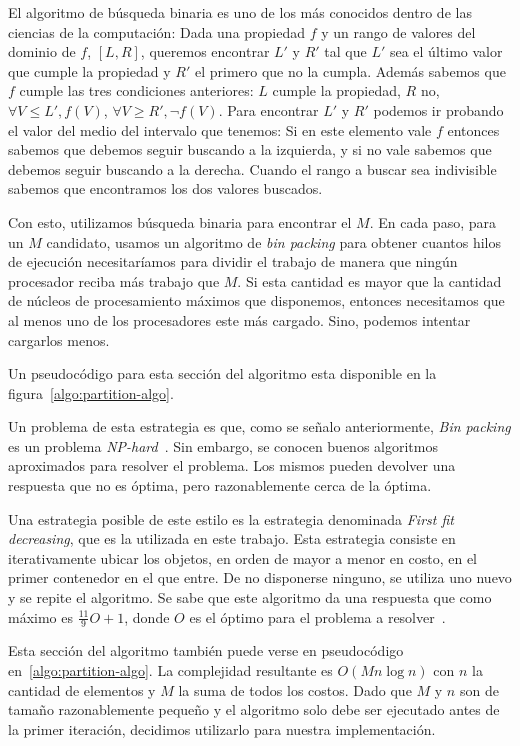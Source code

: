 El algoritmo de b\'usqueda binaria es uno de los m\'as conocidos dentro de las
ciencias de la computaci\'on: Dada una propiedad $f$ y un rango de valores del
dominio de $f$, $[L,R]$, queremos encontrar $L'$ y $R'$ tal que $L'$ sea el
\'ultimo valor que cumple la propiedad y $R'$ el primero que no la cumpla.
Adem\'as sabemos que $f$ cumple las tres condiciones anteriores: $L$ cumple la
propiedad, $R$ no, $\forall V \leq L', f(V)$, $\forall V \geq R', \neg f(V)$.
Para encontrar $L'$ y $R'$ podemos ir probando el valor del medio del intervalo
que tenemos: Si en este elemento vale $f$ entonces sabemos que debemos seguir
buscando a la izquierda, y si no vale sabemos que debemos seguir buscando a la
derecha. Cuando el rango a buscar sea indivisible sabemos que encontramos los
dos valores buscados.

Con esto, utilizamos b\'usqueda binaria para encontrar el $M$. En cada paso, para
un $M$ candidato, usamos un algoritmo de \textit{bin packing} para obtener
cuantos hilos de ejecuci\'on necesitar\'iamos para dividir el trabajo de manera que
ning\'un procesador reciba m\'as trabajo que $M$. Si esta cantidad es mayor que
la cantidad de n\'ucleos de procesamiento m\'aximos que disponemos, entonces
necesitamos que al menos uno de los procesadores este m\'as cargado. Sino, podemos
intentar cargarlos menos.

Un pseudoc\'odigo para esta secci\'on del algoritmo esta disponible en la figura~\ref{algo:partition-algo}.

Un problema de esta estrategia es que, como se se\~nalo anteriormente,
\textit{Bin packing} es un problema \textit{NP-hard}~\cite{NPCompleteness}. Sin
embargo, se conocen buenos algoritmos aproximados para resolver el problema. Los
mismos pueden devolver una respuesta que no es \'optima, pero razonablemente cerca
de la \'optima.

Una estrategia posible de este estilo es la estrategia denominada \textit{First
fit decreasing}, que es la utilizada en este trabajo. Esta estrategia consiste en
iterativamente ubicar los objetos, en orden de mayor a menor en costo,
en el primer contenedor en el que entre. De no disponerse ninguno, se utiliza
uno nuevo y se repite el algoritmo. Se sabe que este algoritmo da una respuesta
que como m\'aximo es $\frac{11}{9} O + 1$, donde $O$ es el \'optimo para el
problema a resolver~\cite{FFDDemo}.

Esta secci\'on del algoritmo tambi\'en puede verse en pseudoc\'odigo en~\ref{algo:partition-algo}.
La complejidad resultante es $O(M n \log n)$ con $n$ la cantidad de elementos y $M$ la suma
de todos los costos. Dado que $M$ y $n$ son de tama\~no razonablemente peque\~no y el algoritmo
solo debe ser ejecutado antes de la primer iteraci\'on, decidimos utilizarlo para
nuestra implementaci\'on.

